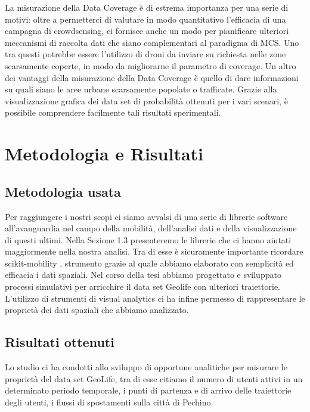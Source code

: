 La misurazione della Data Coverage è di estrema importanza per una serie di motivi: oltre a permetterci di valutare in modo quantitativo l'efficacia di una campagna di crowdsensing, ci fornisce anche un modo per pianificare ulteriori meccanismi di raccolta dati che siano complementari al paradigma di MCS. Uno tra questi potrebbe essere l'utilizzo di droni da inviare su richiesta nelle zone scarsamente coperte, in modo da migliorarne il parametro di coverage.
Un altro dei vantaggi della misurazione della Data Coverage è quello di dare informazioni su quali siano le aree urbane scarsamente popolate o trafficate. Grazie alla visualizzazione grafica dei data set di probabilità ottenuti per i vari scenari, è possibile comprendere facilmente tali risultati sperimentali.

\section*{Metodologia e Risultati}

\subsection*{Metodologia usata}

Per raggiungere i nostri scopi ci siamo avvalsi di una serie di librerie software all'avanguardia nel campo della mobilità, dell'analisi dati e della visualizzazione di questi ultimi. Nella Sezione 1.3 presenteremo le librerie che ci hanno aiutati maggiormente nella nostra analisi. Tra di esse è sicuramente importante ricordare scikit-mobility \cite{pappalardo2019scikitmobility}, strumento grazie al quale abbiamo elaborato con semplicità ed efficacia i dati spaziali.
Nel corso della tesi abbiamo progettato e sviluppato processi simulativi per arricchire il data set Geolife con ulteriori traiettorie.
L'utilizzo di strumenti di visual analytics ci ha infine permesso di rappresentare le proprietà dei dati spaziali che abbiamo analizzato.

\subsection*{Risultati ottenuti}

Lo studio ci ha condotti allo sviluppo di opportune analitiche per misurare le proprietà del data set GeoLife, tra di esse citiamo il numero di utenti attivi in un determinato periodo temporale, i punti di partenza e di arrivo delle traiettorie degli utenti, i flussi di spostamenti sulla città di Pechino.

